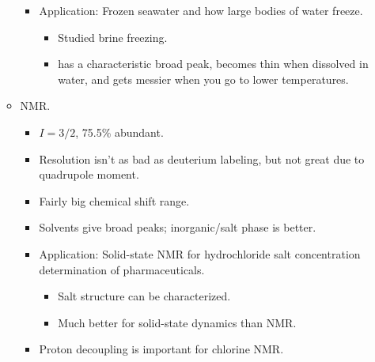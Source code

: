 \documentclass[../notes.tex]{subfiles}
\begin{document}
\begin{itemize}
\begin{itemize}
\begin{itemize}
\begin{itemize}
            \end{itemize}
            \item Application: Frozen seawater and how large bodies of water freeze.
            \begin{itemize}
                \item Studied brine freezing.
                \item {} has a characteristic broad peak, becomes thin when dissolved in water, and gets messier when you go to lower temperatures.
            \end{itemize}
        \end{itemize}
        \item {} NMR.
        \begin{itemize}
            \item $I=3/2$, 75.5\% abundant.
            \item Resolution isn't as bad as deuterium labeling, but not great due to quadrupole moment.
            \item Fairly big chemical shift range.
            \item Solvents give broad peaks; inorganic/salt phase is better.
            \item Application: Solid-state  NMR for hydrochloride salt concentration determination of pharmaceuticals.
            \begin{itemize}
                \item Salt structure can be characterized.
                \item Much better for solid-state dynamics than  NMR.
            \end{itemize}
            \item Proton decoupling is important for chlorine NMR.
        \end{itemize}
    \end{itemize}
\end{itemize}
\end{document}
